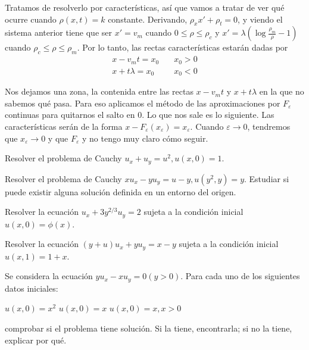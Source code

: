 \begin{problem}[4]
	Tratamos de resolverlo por características, así que vamos a tratar de ver qué ocurre cuando $ρ(x,t) = k$ constante. Derivando, $ρ_xx' + ρ_t = 0$, y viendo el sistema anterior tiene que ser $x' = v_m$ cuando $0 ≤ ρ ≤ ρ_c$ y $x' = λ(\log \frac{ρ_m}{ρ} - 1)$ cuando $ρ_c ≤ ρ ≤ ρ_m$. Por lo tanto, las rectas características estarán dadas por \begin{align*}
	x - v_m t = x_0 & \quad x_0 > 0 \\
	x + tλ = x_0 & \quad x_0 < 0
	\end{align*}

	Nos dejamos una zona, la contenida entre las rectas $x -v_mt$ y $x + tλ$ en la que no sabemos qué pasa. Para eso aplicamos el método de las aproximaciones por $F_ε$ continuas para quitarnos el salto en $0$. Lo que nos sale es lo siguiente. Las características serán de la forma $x- F_ε(x_ε)=  x_ε$. Cuando $ε \to 0$, tendremos que $x_ε \to 0$ y que $F_ε$ y no tengo muy claro cómo seguir.

	\spart


\end{problem}

\begin{problem}[5]
	Resolver el problema de Cauchy $u_x + u_y = u^2, u(x,0) = 1$.

	\solution
\end{problem}

\begin{problem}[6]
	Resolver el problema de Cauchy $xu_x - yu_y = u - y, u(y^2,y)=y$. Estudiar si puede existir alguna solución definida en un entorno del origen.

	\solution
\end{problem}

\begin{problem}[7]
	Resolver la ecuación $u_x + 3y^{2/3} u_y = 2$ sujeta a la condición inicial $u(x,0) = \phi(x)$.

	\solution
\end{problem}

\begin{problem}[8]
	Resolver la ecuación $(y + u)u_x + yu_y = x - y$ sujeta a la condición inicial $u(x,1) = 1 + x$.

	\solution
\end{problem}

\begin{problem}[9]
	Se considera la ecuación $yu_x - xu_y = 0 (y > 0)$. Para cada uno de los siguientes datos iniciales:

	\ppart $u(x, 0) = x^{2}$
	\ppart $u(x,0) = x$
	\ppart $u(x,0) = x, x > 0$

	comprobar si el problema tiene solución. Si la tiene, encontrarla; si no la tiene, explicar por qué.

	\solution

	\spart
	\spart
	\spart
\end{problem}

